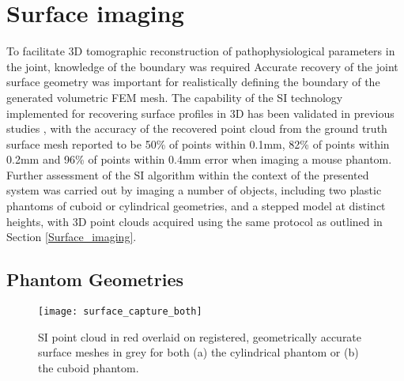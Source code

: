 \documentclass[twoside]{bhamthesis}
\theoremstyle{definition}
\begin{document}
\section{Surface imaging}

To facilitate 3D tomographic reconstruction of pathophysiological parameters in the joint, knowledge of the boundary was required Accurate recovery of the joint surface geometry was important for realistically defining the boundary of the generated volumetric FEM mesh. The capability of the SI technology implemented for recovering surface profiles in 3D has been validated in previous studies \cite{basevi2013simultaneous,guggenheim2014multi}, with the accuracy of the recovered point cloud from the ground truth surface mesh reported to be 50\% of points within 0.1mm, 82\% of points within 0.2mm and 96\% of points within 0.4mm error when imaging a mouse phantom. Further assessment of the SI algorithm within the context of the presented system was carried out by imaging a number of objects, including two plastic phantoms of cuboid or cylindrical geometries, and a stepped model at distinct heights, with 3D point clouds acquired using the same protocol as outlined in Section \ref{Surface_imaging}.


\subsection{Phantom Geometries}
\label{phantom_SI}

\begin{figure}[!ht]
\texttt{[image: surface\_capture\_both]}
\centering
\caption{SI point cloud in red overlaid on registered, geometrically accurate surface meshes in grey for both (a) the cylindrical phantom or (b) the cuboid phantom.}
\label{surface_capture_both}
\end{figure}
\end{document}
